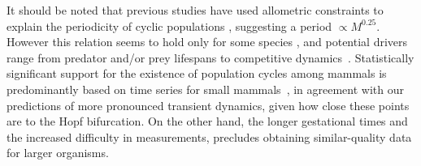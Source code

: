 \documentclass{pnastwo}
\begin{document}
\begin{article}
It should be noted that previous studies have used allometric constraints to explain the periodicity of cyclic populations \cite{CalderIII:1983jd,Peterson:1984hj,Krukonis:1991fk}, suggesting a period $\propto M^{0.25}$.  
However this relation seems to hold only for some species \cite{Hendriks:2012fc}, and potential drivers range from predator and/or prey lifespans to competitive dynamics~\cite{Kendall:1999iy,Hogstedt:2005cr}.
Statistically significant support for the existence of population cycles among mammals is predominantly based on time series for small mammals~\cite{Kendall:1998hl}, in agreement with our predictions of more pronounced transient dynamics, given how close these points are to the Hopf bifurcation.  
On the other hand, the longer gestational times and the increased difficulty in measurements, precludes obtaining similar-quality data for larger organisms.
\vspace{6mm}


\end{article}
\end{document}
